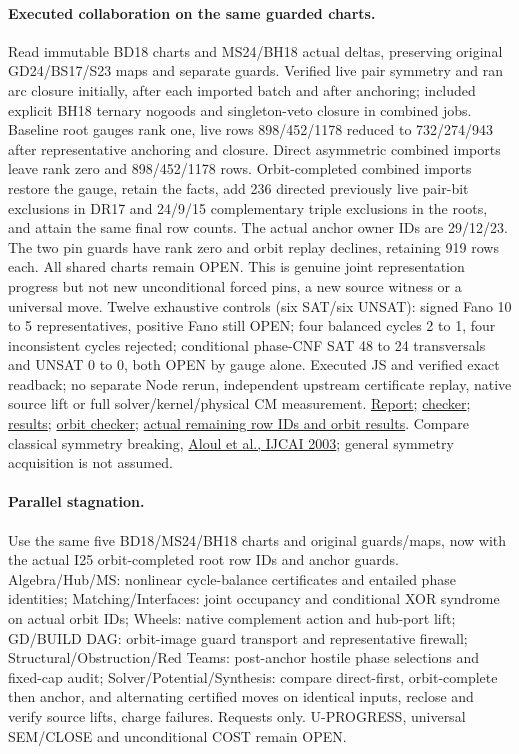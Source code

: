 \documentclass[11pt]{article}
\begin{document}
\paragraph{Executed collaboration on the same guarded charts.}
Read immutable BD18 charts and MS24/BH18 actual deltas, preserving original GD24/BS17/S23 maps and separate guards. Verified live pair symmetry and ran arc closure initially, after each imported batch and after anchoring; included explicit BH18 ternary nogoods and singleton-veto closure in combined jobs. Baseline root gauges rank one, live rows 898/452/1178 reduced to 732/274/943 after representative anchoring and closure. Direct asymmetric combined imports leave rank zero and 898/452/1178 rows. Orbit-completed combined imports restore the gauge, retain the facts, add 236 directed previously live pair-bit exclusions in DR17 and 24/9/15 complementary triple exclusions in the roots, and attain the same final row counts. The actual anchor owner IDs are 29/12/23. The two pin guards have rank zero and orbit replay declines, retaining 919 rows each. All shared charts remain OPEN. This is genuine joint representation progress but not new unconditional forced pins, a new source witness or a universal move. Twelve exhaustive controls (six SAT/six UNSAT): signed Fano 10 to 5 representatives, positive Fano still OPEN; four balanced cycles 2 to 1, four inconsistent cycles rejected; conditional phase-CNF SAT 48 to 24 transversals and UNSAT 0 to 0, both OPEN by gauge alone. Executed JS and verified exact readback; no separate Node rerun, independent upstream certificate replay, native source lift or full solver/kernel/physical CM measurement. \href{https://github.com/j15marti/pnp/commit/898195b296d416aeeed1dbaa91360654671b5785}{Report}; \href{https://github.com/j15marti/pnp/commit/00f604527d354c389a71d21b510fb8bcc936769b}{checker}; \href{https://github.com/j15marti/pnp/commit/e011ad253966a47eb6d07fc560a8836df0d84c3b}{results}; \href{https://github.com/j15marti/pnp/commit/362df9969509d844e6b37e4885aceb884decd235}{orbit checker}; \href{https://github.com/j15marti/pnp/commit/bdda062d50962d29343f7413764acfdf5edbc21b}{actual remaining row IDs and orbit results}. Compare classical symmetry breaking, \href{https://ijcai.org/proceedings/2003/40}{Aloul et al., IJCAI 2003}; general symmetry acquisition is not assumed.
\paragraph{Parallel stagnation.}
Use the same five BD18/MS24/BH18 charts and original guards/maps, now with the actual I25 orbit-completed root row IDs and anchor guards. Algebra/Hub/MS: nonlinear cycle-balance certificates and entailed phase identities; Matching/Interfaces: joint occupancy and conditional XOR syndrome on actual orbit IDs; Wheels: native complement action and hub-port lift; GD/BUILD DAG: orbit-image guard transport and representative firewall; Structural/Obstruction/Red Teams: post-anchor hostile phase selections and fixed-cap audit; Solver/Potential/Synthesis: compare direct-first, orbit-complete then anchor, and alternating certified moves on identical inputs, reclose and verify source lifts, charge failures. Requests only. U-PROGRESS, universal SEM/CLOSE and unconditional COST remain OPEN.
\end{document}
